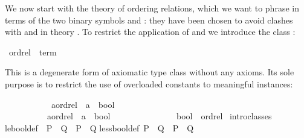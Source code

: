%
\begin{isabellebody}%
\def\isabellecontext{Overloading{\isadigit{1}}}%
%
%
\begin{isamarkuptext}%
We now start with the theory of ordering relations, which we want to phrase
in terms of the two binary symbols \isa{{\isacharless}{\isacharless}} and \isa{{\isacharless}{\isacharless}{\isacharequal}}: they have
been chosen to avoid clashes with \isa{{\isasymle}} and \isa{{\isacharless}} in theory . To restrict the application of \isa{{\isacharless}{\isacharless}} and \isa{{\isacharless}{\isacharless}{\isacharequal}} we
introduce the class :%
\end{isamarkuptext}%
\ ordrel\ {\isacharless}\ {\isachardoublequote}term{\isachardoublequote}%
\begin{isamarkuptext}%
\noindent
This is a degenerate form of axiomatic type class without any axioms.
Its sole purpose is to restrict the use of overloaded constants to meaningful
instances:%
\end{isamarkuptext}%
\isanewline
\ \ {\isachardoublequote}{\isacharless}{\isacharless}{\isachardoublequote}\ \ \ \ \ \ \ \ {\isacharcolon}{\isacharcolon}\ {\isachardoublequote}{\isacharparenleft}{\isacharprime}a{\isacharcolon}{\isacharcolon}ordrel{\isacharparenright}\ {\isasymRightarrow}\ {\isacharprime}a\ {\isasymRightarrow}\ bool{\isachardoublequote}\ \ \ \ \ \ \ \ \ \ \ \ \ {\isacharparenleft}\ {}{}{\isacharparenright}\isanewline
\ \ {\isachardoublequote}{\isacharless}{\isacharless}{\isacharequal}{\isachardoublequote}\ \ \ \ \ \ \ {\isacharcolon}{\isacharcolon}\ {\isachardoublequote}{\isacharparenleft}{\isacharprime}a{\isacharcolon}{\isacharcolon}ordrel{\isacharparenright}\ {\isasymRightarrow}\ {\isacharprime}a\ {\isasymRightarrow}\ bool{\isachardoublequote}\ \ \ \ \ \ \ \ \ \ \ \ \ {\isacharparenleft}\ {}{}{\isacharparenright}\isanewline
\isanewline
{}\ bool\ {\isacharcolon}{\isacharcolon}\ ordrel\isanewline
{}\ intro{\isacharunderscore}classes\isanewline
\isanewline
{}\ {\isacharparenleft}\isanewline
le{\isacharunderscore}bool{\isacharunderscore}def{\isacharcolon}\ \ {\isachardoublequote}P\ {\isacharless}{\isacharless}{\isacharequal}\ Q\ {\isasymequiv}\ P\ {\isasymlongrightarrow}\ Q{\isachardoublequote}\isanewline
less{\isacharunderscore}bool{\isacharunderscore}def{\isacharcolon}\ {\isachardoublequote}P\ {\isacharless}{\isacharless}\ Q\ {\isasymequiv}\ {\isasymnot}P\ {\isasymand}\ Q{\isachardoublequote}%

\end{isabellebody}

